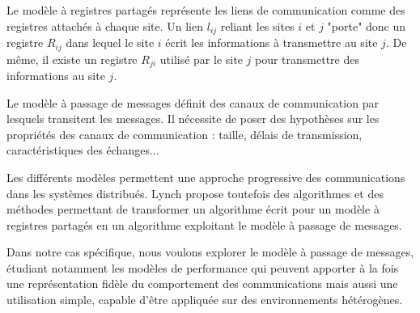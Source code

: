 Le modèle à registres partagés représente les liens de communication
comme des registres attachés à chaque site. Un lien $l_{ij}$ reliant
les sites $i$ et $j$ "porte" donc un registre $R_{ij}$ dans lequel
le site $i$ écrit les informations à transmettre au site $j$. De même,
il existe un registre $R_{ji}$ utilisé par le site $j$ pour
transmettre des informations au site $j$.

Le modèle à passage de messages définit des canaux de communication
par lesquels transitent les messages. Il nécessite de poser des
hypothèses sur les propriétés des canaux de communication : taille,
délais de transmission, caractéristiques des échanges...

Les différents modèles permettent une approche progressive des
communications dans les systèmes distribués. Lynch \cite{Lyn96}
propose toutefois des algorithmes et des méthodes permettant de
transformer un algorithme écrit pour un modèle à registres partagés en
un algorithme exploitant le modèle à passage de messages.

Dans notre cas spécifique, nous voulons explorer le modèle à passage de messages,
étudiant notamment les modèles de performance qui peuvent apporter à la fois une
représentation fidèle du comportement des communications mais aussi une 
utilisation simple, capable d'être appliquée sur des environnements hétérogènes.

